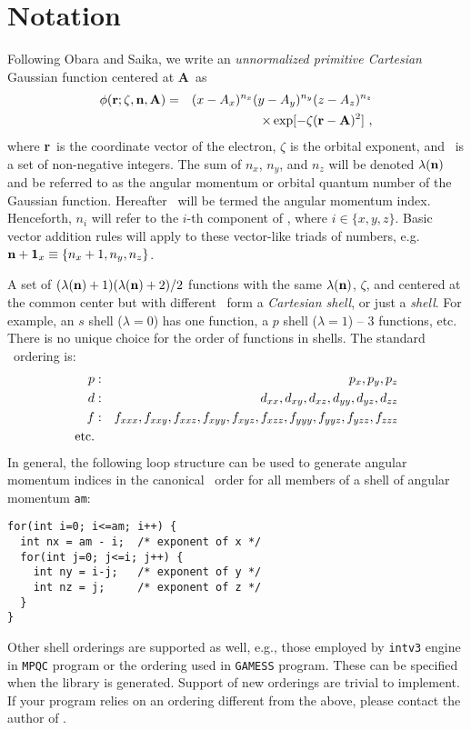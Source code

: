 \documentclass[12pt]{article}
\begin{document}
\section{\label{sec:notation} Notation}

Following Obara and Saika,\cite{Obara86}
we write an {\em unnormalized primitive Cartesian} Gaussian function centered at {\bf A}\ as
\begin{eqnarray}
\phi ({\bf r}; \zeta, {\bf n}, {\bf A}) & = & (x - A_x)^{n_x} (y - A_y)^{n_y} (z - A_z)^{n_z} \nonumber \\
& & \times \exp [-\zeta({\bf r}-{\bf A})^2]\ ,
\end{eqnarray}
where {\bf r}\ is the coordinate vector of the electron, $\zeta$ is the orbital exponent, and
\n\ is a set of non-negative integers. The sum of $n_x$, $n_y$, and $n_z$ will be denoted $\lambda({\bf n})$
and be referred to as the angular momentum or orbital quantum number of the Gaussian function.
Hereafter \n\ will be termed the angular momentum index.
Henceforth, $n_i$ will refer to the $i$-th component of \n, where $i \in \{x, y, z\}$.
Basic vector addition rules will apply to these vector-like triads of numbers, e.g.
${\bf n} + {\bf 1}_x \equiv \{ n_x+1, n_y, n_z\}$.

A set of $(\lambda({\bf n}) + 1)(\lambda({\bf n}) + 2)/2$ functions with the same $\lambda({\bf n})$, $\zeta$, and centered
at the common center
but with different \n\ form a {\em Cartesian shell},
or just a {\em shell}. For example, an $s$ shell ($\lambda=0$) has one function, a $p$ shell ($\lambda=1$) --
3 functions, etc.
There is no unique choice for the order of functions in shells.
The standard \LIBINT\ ordering is:
\begin{eqnarray}
p & : & p_x, p_y, p_z \nonumber \\
d & : & d_{xx}, d_{xy}, d_{xz}, d_{yy}, d_{yz}, d_{zz} \nonumber \\
f & : & f_{xxx}, f_{xxy}, f_{xxz}, f_{xyy}, f_{xyz}, f_{xzz}, f_{yyy}, f_{yyz}, f_{yzz}, f_{zzz} \nonumber \\
{\rm etc.} \nonumber
\end{eqnarray}
In general, the following loop structure can be used to generate angular momentum indices in the canonical \LIBINT\ order for all
members of a shell of angular momentum {\tt am}:
\begin{verbatim}
for(int i=0; i<=am; i++) {
  int nx = am - i;  /* exponent of x */
  for(int j=0; j<=i; j++) {
    int ny = i-j;   /* exponent of y */
    int nz = j;     /* exponent of z */
  }
}
\end{verbatim}
Other shell orderings are supported as well, e.g., those employed by {\tt intv3} engine in {\tt MPQC} program
or the ordering used in {\tt GAMESS} program. These can be specified when the library is generated.
Support of new orderings are trivial to implement. If your program relies on an ordering different from the
above, please contact the author of \LIBINT .
\end{document}
